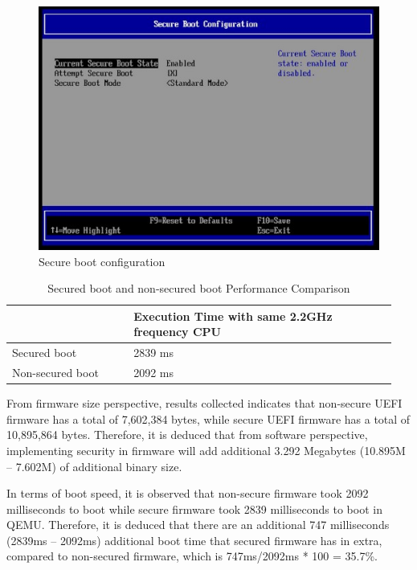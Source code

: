\documentclass[review]{elsarticle}
\begin{document}
\begin{figure}[hbt!]
	\centering
	\includegraphics[width=1\textwidth]{figs/SecureBootConfiguration.JPG}
	\caption{Secure boot configuration}
\end{figure}

\begin{table}[hbt!]
\caption{Secured boot and non-secured boot Performance Comparison}
    \begin{tabular}{|p{0.3\linewidth} | p{0.65\linewidth} |}
        \hline
         & Execution Time with same 2.2GHz frequency CPU\\
        \hline 
        Secured boot & 2839 ms  \\
        \hline
        Non-secured boot & 2092 ms \\
        \hline
    \end{tabular}
\end{table}


From firmware size perspective, results collected indicates that non-secure UEFI firmware has a total of 7,602,384 bytes, while secure UEFI firmware has a total of 10,895,864 bytes. Therefore, it is deduced that from software perspective, implementing security in firmware will add additional 3.292 Megabytes (10.895M – 7.602M) of additional binary size.

In terms of boot speed, it is observed that non-secure firmware took 2092 milliseconds to boot while secure firmware took 2839 milliseconds to boot in QEMU. Therefore, it is deduced that there are an additional 747 milliseconds (2839ms – 2092ms) additional boot time that secured firmware has in extra, compared to non-secured firmware, which is 747ms/2092ms * 100 = 35.7\%.
\end{document}
